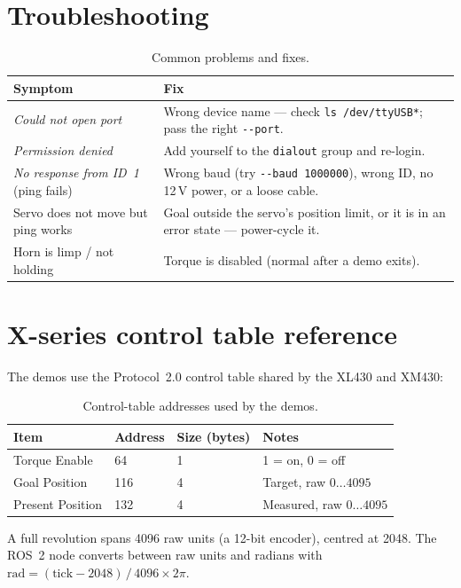 \documentclass[11pt,a4paper]{article}
\begin{document}
\section{Troubleshooting}
\begin{table}[h]
\centering
\begin{tabular}{@{}p{5cm}p{8.5cm}@{}}
\toprule
\textbf{Symptom} & \textbf{Fix} \\
\midrule
\emph{Could not open port} & Wrong device name --- check \texttt{ls /dev/ttyUSB*}; pass the right \texttt{-{}-port}. \\
\emph{Permission denied} & Add yourself to the \texttt{dialout} group and re-login. \\
\emph{No response from ID~1} (ping fails) & Wrong baud (try \texttt{-{}-baud 1000000}), wrong ID, no 12\,V power, or a loose cable. \\
Servo does not move but ping works & Goal outside the servo's position limit, or it is in an error state --- power-cycle it. \\
Horn is limp / not holding & Torque is disabled (normal after a demo exits). \\
\bottomrule
\end{tabular}
\caption{Common problems and fixes.}
\end{table}

\appendix
\section{X-series control table reference}
The demos use the Protocol~2.0 control table shared by the XL430 and XM430:
\begin{table}[h]
\centering
\begin{tabular}{@{}llll@{}}
\toprule
\textbf{Item} & \textbf{Address} & \textbf{Size (bytes)} & \textbf{Notes} \\
\midrule
Torque Enable     & 64  & 1 & 1 = on, 0 = off \\
Goal Position     & 116 & 4 & Target, raw $0\ldots4095$ \\
Present Position  & 132 & 4 & Measured, raw $0\ldots4095$ \\
\bottomrule
\end{tabular}
\caption{Control-table addresses used by the demos.}
\end{table}
A full revolution spans 4096 raw units (a 12-bit encoder), centred at 2048. The
ROS~2 node converts between raw units and radians with
$\text{rad} = (\text{tick}-2048)\,/\,4096 \times 2\pi$.
\end{document}
